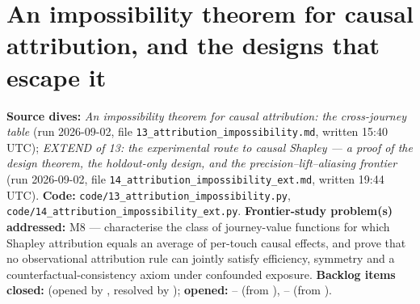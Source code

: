 \chapter[Causal attribution: the impossibility and its escape]{An impossibility theorem for causal attribution, and the designs that escape it}
\label{ch:attribution}

\begin{provenance}
\textbf{Source dives:}  \emph{An impossibility theorem for causal attribution: the cross-journey table} (run 2026-09-02, file \texttt{13\_attribution\_impossibility.md}, written 15:40 UTC);  \emph{EXTEND of 13: the experimental route to causal Shapley --- a proof of the design theorem, the holdout-only design, and the precision--lift--aliasing frontier} (run 2026-09-02, file \texttt{14\_attribution\_impossibility\_ext.md}, written 19:44 UTC).
\textbf{Code:} \texttt{code/13\_attribution\_impossibility.py}, \texttt{code/14\_attribution\_impossibility\_ext.py}.
\textbf{Frontier-study problem(s) addressed:} M8 --- characterise the class of journey-value functions for which Shapley attribution equals an average of per-touch causal effects, and prove that no observational attribution rule can jointly satisfy efficiency, symmetry and a counterfactual-consistency axiom under confounded exposure.
\textbf{Backlog items closed:}  (opened by , resolved by ); \textbf{opened:} -- (from ), -- (from ).
\end{provenance}

